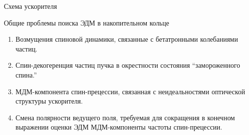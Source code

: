 \documentclass[14pt]{beamer}
\begin{document}
\begin{frame}{Схема ускорителя}
	\centering
\end{frame}

\begin{frame}{Общие проблемы поиска ЭДМ в накопительном кольце}
	\begin{enumerate}
		\item Возмущения спиновой динамики, связанные с бетатронными колебаниями частиц.
		\item Спин-декогеренция частиц пучка в окрестности состояния ``замороженного спина.''
		\item МДМ-компонента спин-прецессии, связанная с неидеальностями оптической структуры ускорителя.
		\item Смена полярности ведущего поля, требуемая для сокращения в конечном выражении оценки ЭДМ МДМ-компоненты частоты спин-прецессии.
	\end{enumerate}
\end{frame}
\end{document}
